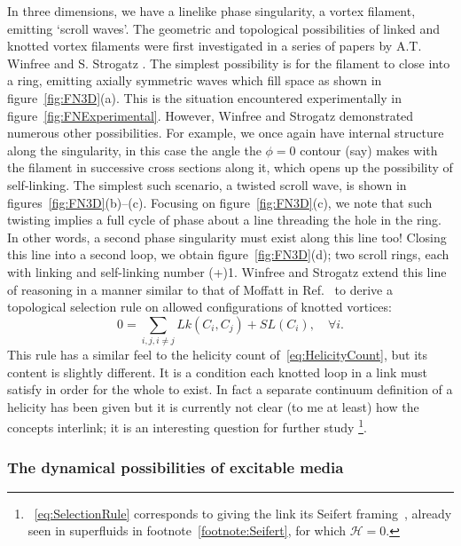 In three dimensions, we have a linelike phase singularity, a vortex filament, emitting `scroll waves'. The geometric and topological possibilities of linked and knotted vortex filaments were first investigated in a series of papers by A.T. Winfree and S. Strogatz \citep{Winfree1983, Winfree1983b, Winfree1983c, Winfree1984}. The simplest possibility is for the filament to close into a ring, emitting axially symmetric waves which fill space as shown in figure~\ref{fig:FN3D}(a). This is the situation encountered experimentally in figure~\ref{fig:FNExperimental}. However, Winfree and Strogatz demonstrated numerous other possibilities. For example, we once again have internal structure along the singularity, in this case the angle the $\phi=0$ contour (say) makes with the filament in successive cross sections along it, which opens up the possibility of self-linking. The simplest such scenario, a twisted scroll wave, is shown in figures~\ref{fig:FN3D}(b)--(c). Focusing on figure~\ref{fig:FN3D}(c), we note that such twisting implies a full cycle of phase about a line threading the hole in the ring. In other words, a second phase singularity must exist along this line too! Closing this line into a second loop, we obtain figure~\ref{fig:FN3D}(d); two scroll rings, each with linking and self-linking number (+)1. Winfree and Strogatz extend this line of reasoning in a manner similar to that of Moffatt in Ref.~\citep{Moffatt1969} to derive a topological selection rule on allowed configurations of knotted vortices: 
\begin{equation}
    0 = \sum_{i,j, i\neq j} Lk(C_i,C_j) + SL(C_i), \quad \forall i. 
    \label{eq:SelectionRule}
\end{equation}
This rule has a similar feel to the helicity count of~\eqref{eq:HelicityCount}, but its content is slightly different. It is a condition each knotted loop in a link must satisfy in order for the whole to exist. In fact a separate continuum definition of a helicity has been given \citep{Trueba2009} but it is currently not clear (to me at least) how the concepts interlink; it is an interesting question for further study \footnote{~\eqref{eq:SelectionRule} corresponds to giving the link its Seifert framing~\citep{Winfree1983c,MoffattBook}, already seen in superfluids in footnote~\ref{footnote:Seifert}, for which $\mathcal{H}=0$.}.

\subsubsection{The dynamical possibilities of excitable media}

